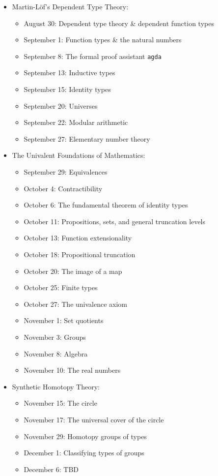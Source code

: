 \documentclass{amsart}
\theoremstyle{definition}
\theoremstyle{remark}
\numberwithin{equation}{section}
\begin{document}
\begin{itemize}
\item {Martin-L\"of's Dependent Type Theory:}
\begin{itemize}
\item {August 30: Dependent type theory \& dependent function types}
\item {September 1: Function types \& the natural numbers}
\item {September 8: The formal proof assistant \texttt{agda}}
\item {September 13: Inductive types}
\item {September 15: Identity types}
\item {September 20: Universes}
\item {September 22: Modular arithmetic}
\item {September 27: Elementary number theory}
\end{itemize}
\item {The Univalent Foundations of Mathematics:}
\begin{itemize}
\item {September 29: Equivalences}
\item {October 4: Contractibility}
\item {October 6: The fundamental theorem of identity types}
\item {October 11: Propositions, sets, and general truncation levels}
\item {October 13: Function extensionality}
\item {October 18: Propositional truncation}
\item {October 20: The image of a map}
\item {October 25: Finite types}
\item {October 27: The univalence axiom}
\item {November 1: Set quotients}
\item {November 3: Groups}
\item {November 8: Algebra}
\item {November 10: The real numbers}
\end{itemize}
\item {Synthetic Homotopy Theory:}
\begin{itemize}
\item {November 15: The circle}
\item {November 17: The universal cover of the circle}
\item {November 29: Homotopy groups of types}
\item {December 1: Classifying types of groups}
\item {December 6: TBD}
\end{itemize}
\end{itemize}

 
\end{document}
